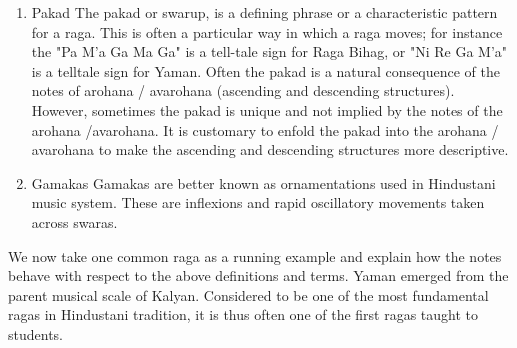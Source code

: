 \begin{enumerate}
  \par
  \item Pakad
  The pakad or swarup, is a defining phrase or a characteristic pattern for a raga.  This is often a particular way in which a raga moves; for instance the "Pa M'a Ga Ma Ga" is a tell-tale sign for Raga Bihag, or "Ni Re Ga M'a" is a telltale sign for Yaman.  Often the pakad is a natural consequence of the notes of arohana / avarohana (ascending and descending structures).  However, sometimes the pakad is unique and not implied by the notes of the arohana /avarohana.  It is customary to enfold the pakad into the arohana / avarohana to make the ascending and descending structures more descriptive.
  \par
  \item Gamakas
  Gamakas are better known as ornamentations used in Hindustani music system. These are inflexions and rapid oscillatory movements taken across swaras.
\end{enumerate}
\par

We now take one common raga as a running example and explain how the notes behave with respect to the above definitions and terms. Yaman emerged from the parent musical scale of Kalyan. Considered to be one of the most fundamental ragas in Hindustani tradition, it is thus often one of the first ragas taught to students. 
